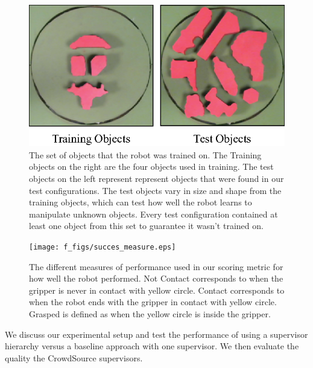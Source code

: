 \documentclass[10pt, conference]{ieeeconf}      %
\begin{document}
\begin{figure}[t]
\centering
\includegraphics{f_figs/shapes_set.eps}

\caption{\footnotesize  The set of objects that the robot was trained on. The Training objects on the right are the four objects used in training. The test objects on the left represent represent objects that were found in our test configurations. The test objects vary in size and shape from the training objects, which can test how well the robot learns to manipulate unknown objects. Every test configuration contained at least one object from this set to guarantee it wasn't trained on.  }

\label{fig:shape_set}
\end{figure}


\begin{figure}[t]
\centering
\texttt{[image: f\_figs/succes\_measure.eps]}

\caption{\footnotesize  The different measures of performance used in our scoring metric for how well the robot performed.  Not  Contact corresponds to when the gripper is never in contact with yellow circle. Contact corresponds to when the robot ends with the gripper in contact with yellow circle. Grasped is defined as when the yellow circle is inside the gripper. }
\vspace*{-20pt}
\label{fig:suc_meas}
\end{figure}

We discuss our experimental setup and test the performance of using a supervisor hierarchy versus a baseline approach
with one supervisor. We then evaluate the quality the CrowdSource supervisors. 
\end{document}
